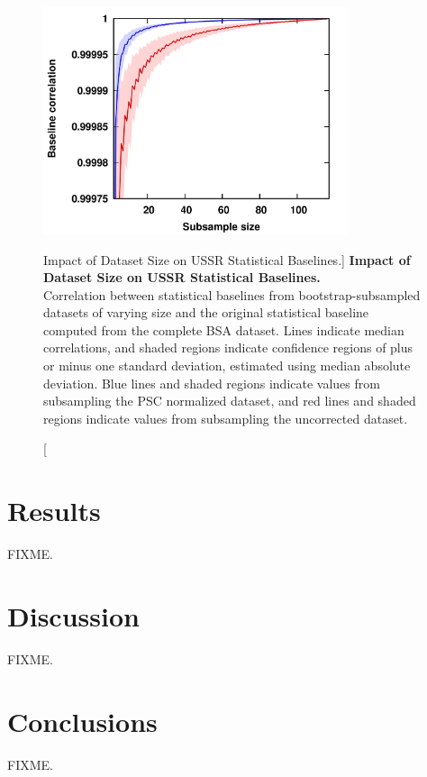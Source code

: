 \begin{figure}
\includegraphics[width=3.5in]{figs/pscorr/08-blcorr.png}
\caption
      [Impact of Dataset Size on USSR Statistical Baselines.]{
  {\bf Impact of Dataset Size on USSR Statistical Baselines.}
  \\
  Correlation between statistical baselines from bootstrap-subsampled datasets
  of varying size and the original statistical baseline computed from the
  complete BSA dataset. Lines indicate median correlations, and shaded regions
  indicate confidence regions of plus or minus one standard deviation,
  estimated using median absolute deviation. Blue lines and shaded regions
  indicate values from subsampling the PSC normalized dataset, and red lines
  and shaded regions indicate values from subsampling the uncorrected dataset.
}
\end{figure}

\section{Results}

\begin{doublespace}
FIXME.
\end{doublespace}

\section{Discussion}

\begin{doublespace}
FIXME.
\end{doublespace}

\section{Conclusions}

\begin{doublespace}
FIXME.
\end{doublespace}




